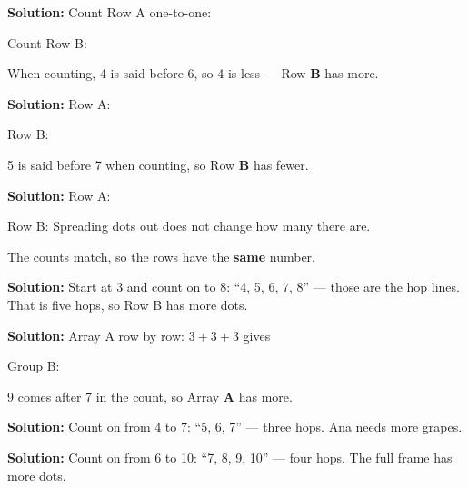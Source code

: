 \documentclass[12pt]{article}
\begin{document}



\textbf{Solution:} Count Row A one-to-one: 

Count Row B: 

When counting, 4 is said before 6, so 4 is less --- Row \textbf{B} has more.


\textbf{Solution:} Row A: 

Row B: 

5 is said before 7 when counting, so Row \textbf{B} has fewer. 


\textbf{Solution:} Row A: 

Row B:  \quad Spreading dots out does not change how many there are.

The counts match, so the rows have the \textbf{same} number. 


\textbf{Solution:} Start at 3 and count on to 8: ``4, 5, 6, 7, 8'' --- those
are the hop lines. That is five hops, so Row B has  more dots.


\textbf{Solution:} Array A row by row: $3 + 3 + 3$ gives 

Group B: 

9 comes after 7 in the count, so Array \textbf{A} has more. 


\textbf{Solution:} Count on from 4 to 7: ``5, 6, 7'' --- three hops. Ana needs
 more grapes.


\textbf{Solution:} Count on from 6 to 10: ``7, 8, 9, 10'' --- four hops. The
full frame has  more dots.

\end{document}
